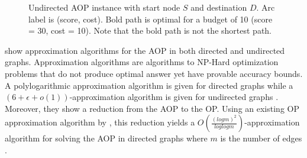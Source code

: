 \documentclass[honors]{union-cs-thesis}
\begin{document}
\begin{figure}[h]
\begin{center}
\end{center}
\caption{Undirected AOP instance with start node $S$ and destination $D$. Arc label is (score, cost). Bold path is optimal for a budget of 10 (score = 30, cost = 10). Note that the bold path is not the shortest path.\label{fig:aop-example}}
\end{figure}

 
\citeauthor{gavalas2015approximation} show approximation algorithms for the AOP in both directed and undirected graphs. Approximation algorithms are algorithms to NP-Hard optimization problems that do not produce optimal answer yet have provable accuracy bounds. A polylogarithmic approximation algorithm is given for directed graphs while a $(6 + \epsilon + o(1))$-approximation algorithm is given for undirected graphs \cite{gavalas2015approximation}. Moreover, they show a reduction from the AOP to the OP. Using an existing OP approximation algorithm by \citeauthor{nagarajan2011directed}, this reduction yields a $O(\frac{(log m)^2}{loglogm})$-approximation algorithm for solving the AOP in directed graphs where $m$ is the number of edges \cite{gavalas2015approximation}.
\end{document}
